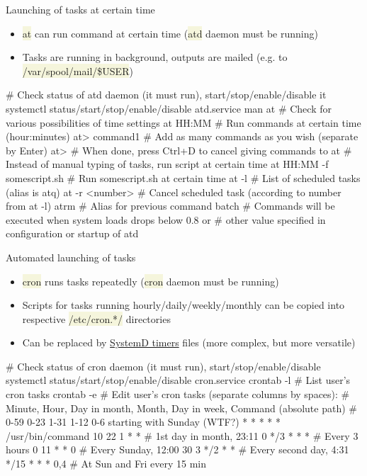 \documentclass[compress, xelatex, 11pt, xcolor=svgnames, aspectratio=169,
	hyperref={
		bookmarks=true,
		unicode=true,
		colorlinks=true,
		pdftitle={Linux, command line and MetaCentrum},
		plainpages=false,
		pdfauthor={Vojtech Zeisek},
		pdfsubject={Course about use of Linux command line, writing shell scripts and using MetaCentrum of CESNET},
		pdfcreator={XeLaTeX},
		pdfkeywords={Linux, GNU, BASH, shell, command line, MetaCentrum},
		linkcolor=DarkRed, %
		anchorcolor=DarkBlue, %
		citecolor=Indigo, %
		filecolor=NavyBlue, %
		menucolor=DarkMagenta, %
		urlcolor=DarkBlue, %
		},
	url={hyphens, lowtilde} %
	]{beamer}
\renewcommand{\texttt}[1]{\colorbox{Beige}{{\ttfamily #1}}}
\begin{document}
\begin{frame}[fragile]{Launching of tasks at certain time}
	\begin{itemize}
		\item \texttt{at} can run command at certain time (\texttt{atd} daemon must be running)
		\item Tasks are running in background, outputs are mailed (e.g. to \texttt{/var/spool/mail/\$USER})
	\end{itemize}
	\vfill
	\begin{bashcode}
    # Check status of atd daemon (it must run), start/stop/enable/disable it
    systemctl status/start/stop/enable/disable atd.service
    man at # Check for various possibilities of time settings
    at HH:MM # Run commands at certain time (hour:minutes)
    at> command1 # Add as many commands as you wish (separate by Enter)
    at> # When done, press Ctrl+D to cancel giving commands to at
    # Instead of manual typing of tasks, run script at certain time
    at HH:MM -f somescript.sh # Run somescript.sh at certain time
    at -l # List of scheduled tasks (alias is atq)
    at -r <number> # Cancel scheduled task (according to number from at -l)
    atrm # Alias for previous command
    batch # Commands will be executed when system loads drops below 0.8 or
          # other value specified in configuration or startup of atd
	\end{bashcode}
\end{frame}

\begin{frame}[fragile]{Automated launching of tasks}
	\begin{itemize}
		\item \texttt{cron} runs tasks repeatedly (\texttt{cron} daemon must be running)
		\item Scripts for tasks running hourly/daily/weekly/monthly can be copied into respective \texttt{/etc/cron.*/} directories
		\item Can be replaced by \href{https://www.freedesktop.org/software/systemd/man/systemd.timer.html}{SystemD timers} files (more complex, but more versatile)
	\end{itemize}
	\vfill
	\begin{bashcode}
    # Check status of cron daemon (it must run), start/stop/enable/disable
    systemctl status/start/stop/enable/disable cron.service
    crontab -l # List user's cron tasks
    crontab -e # Edit user's cron tasks (separate columns by spaces):
    # Minute, Hour, Day in month, Month, Day in week, Command (absolute path)
    # 0-59    0-23  1-31          1-12   0-6 starting with Sunday (WTF?)
      *       *     *             *      *            /usr/bin/command
      10      22    1             *      *    # 1st day in month, 23:11
      0       */3   *             *      *    # Every 3 hours
      0       11    *             *      0    # Every Sunday, 12:00
      30      3     */2           *      *    # Every second day, 4:31
      */15    *     *             *      0,4  # At Sun and Fri every 15 min
	\end{bashcode}
\end{frame}
\end{document}
